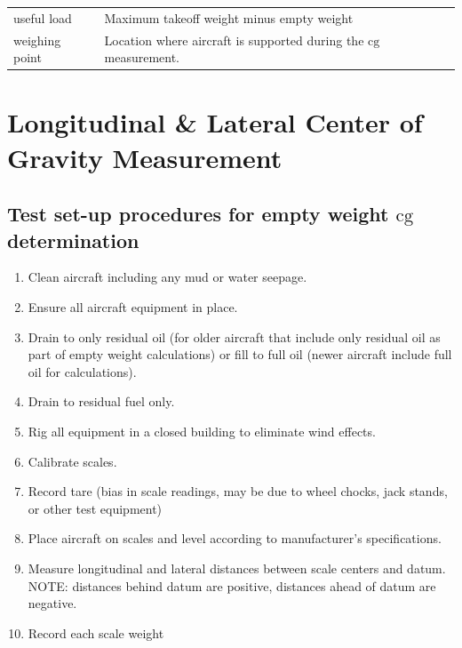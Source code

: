 \documentclass[
]{book}
\providecommand{\tightlist}{%
  \setlength{\itemsep}{0pt}\setlength{\parskip}{0pt}}
\begin{document}
\begin{longtable}[]{@{}ll@{}}
\begin{minipage}[t]{0.11\columnwidth}\raggedright
useful load\strut
\end{minipage} & \begin{minipage}[t]{0.83\columnwidth}\raggedright
Maximum takeoff weight minus empty weight\strut
\end{minipage}\tabularnewline
\begin{minipage}[t]{0.11\columnwidth}\raggedright
weighing point\strut
\end{minipage} & \begin{minipage}[t]{0.83\columnwidth}\raggedright
Location where aircraft is supported during the \(\mathrm{cg}\) measurement.\strut
\end{minipage}\tabularnewline
\bottomrule
\end{longtable}

\hypertarget{longitudinal-lateral-center-of-gravity-measurement}{%
\section{Longitudinal \& Lateral Center of Gravity Measurement}\label{longitudinal-lateral-center-of-gravity-measurement}}

\hypertarget{test-set-up-procedures-for-empty-weight-mathrmcg-determination}{%
\subsection*{\texorpdfstring{Test set-up procedures for empty weight \(\mathrm{cg}\) determination}{Test set-up procedures for empty weight \textbackslash mathrm\{cg\} determination}}\label{test-set-up-procedures-for-empty-weight-mathrmcg-determination}}

\begin{enumerate}
\def\labelenumi{\arabic{enumi}.}
\tightlist
\item
  Clean aircraft including any mud or water seepage.
\item
  Ensure all aircraft equipment in place.
\item
  Drain to only residual oil (for older aircraft that include only residual oil as part of empty weight calculations) or fill to full oil (newer aircraft include full oil for calculations).
\item
  Drain to residual fuel only.
\item
  Rig all equipment in a closed building to eliminate wind effects.
\item
  Calibrate scales.
\item
  Record tare (bias in scale readings, may be due to wheel chocks, jack stands, or other test equipment)
\item
  Place aircraft on scales and level according to manufacturer's specifications.
\item
  Measure longitudinal and lateral distances between scale centers and datum. NOTE: distances behind datum are positive, distances ahead of datum are negative.
\item
  Record each scale weight
\end{enumerate}
\end{document}
